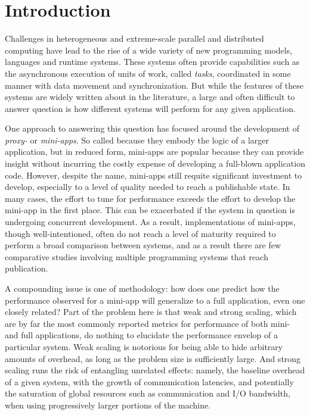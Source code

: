 \section{Introduction}
\label{sec:introduction}

Challenges in heterogeneous and extreme-scale parallel and distributed
computing have lead to the rise of a wide variety of new programming
models, languages and runtime systems. These systems often provide
capabilities such as the asynchronous execution of units of work, called
\emph{tasks}, coordinated in some manner with data movement and
synchronization. But while the features of these systems are widely
written about in the literature, a large and often difficult to answer
question is how different systems will perform for any given
application.

One approach to answering this question has focused around the
development of \emph{proxy-} or \emph{mini-apps}. So called because
they embody the logic of a larger application, but in reduced form,
mini-apps are popular because they can provide insight without
incurring the costly expense of developing a full-blown application
code. However, despite the name, mini-apps still requite significant
investment to develop, especially to a level of quality needed to reach
a publishable state. In many cases, the effort to tune for performance
exceeds the effort to develop the mini-app in the first place. This
can be exacerbated if the system in question is undergoing concurrent
development. As a result, implementations of mini-apps, though
well-intentioned, often do not reach a level of maturity required to
perform a broad comparison between systems, and as a result there are
few comparative studies involving multiple programming systems
that reach publication.

A compounding issue is one of methodology: how does one predict how
the performance observed for a mini-app will generalize to a full
application, even one closely related? Part of the problem here is
that weak and strong scaling, which are by far the most commonly
reported metrics for performance of both mini- and full applications,
do nothing to elucidate the performance envelop of a particular
system. Weak scaling is notorious for being able to hide arbitrary
amounts of overhead, as long as the problem size is sufficiently
large. And strong scaling runs the risk of entangling unrelated
effects: namely, the baseline overhead of a given system, with the
growth of communication latencies, and potentially the saturation of
global resources such as communication and I/O bandwidth, when using
progressively larger portions of the machine.

